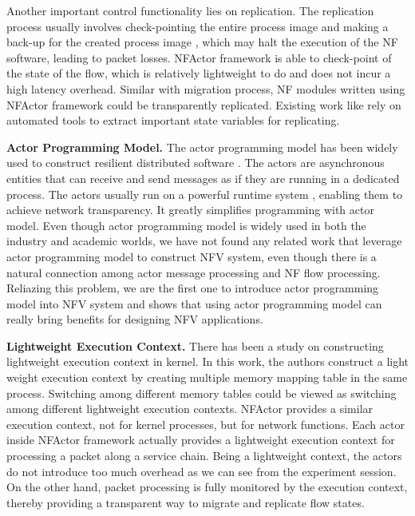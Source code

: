 Another important control functionality lies on replication. The replication process usually involves check-pointing the entire process image and making a back-up for the created process image \cite{sherry2015rollback}, which may halt the execution of the NF software, leading to packet losses. NFActor framework is able to check-point of the state of the flow, which is relatively lightweight to do and does not incur a high latency overhead. Similar with migration process, NF modules written using NFActor framework could be transparently replicated. Existing work like \cite{sherry2015rollback} rely on automated tools to extract important state variables for replicating.

\textbf{Actor Programming Model.} The actor programming model has been widely used to construct resilient distributed software \cite{erlang, akka, Orleans, caf}. The actors are asynchronous entities that can receive and send messages as if they are running in a dedicated process. The actors usually run on a powerful runtime system \cite{erlang, akka, caf}, enabling them to achieve network transparency. It greatly simplifies programming with actor model. Even though actor programming model is widely used in both the industry and academic worlds, we have not found any related work that leverage actor programming model to construct NFV system, even though there is a natural connection among actor message processing and NF flow processing. Reliazing this problem, we are the first one to introduce actor programming model into NFV system and shows that using actor programming model can really bring benefits for designing NFV applications.

\textbf{Lightweight Execution Context. } There has been a study on constructing lightweight execution context \cite{litton2016light} in kernel. In this work, the authors construct a light weight execution context by creating multiple memory mapping table in the same process. Switching among different memory tables could be viewed as switching among different lightweight execution contexts. NFActor provides a similar execution context, not for kernel processes, but for network functions. Each actor inside NFActor framework actually provides a lightweight execution context for processing a packet along a service chain. Being a lightweight context, the actors do not introduce too much overhead as we can see from the experiment session. On the other hand, packet processing is fully monitored by the execution context, thereby providing a transparent way to migrate and replicate flow states.








